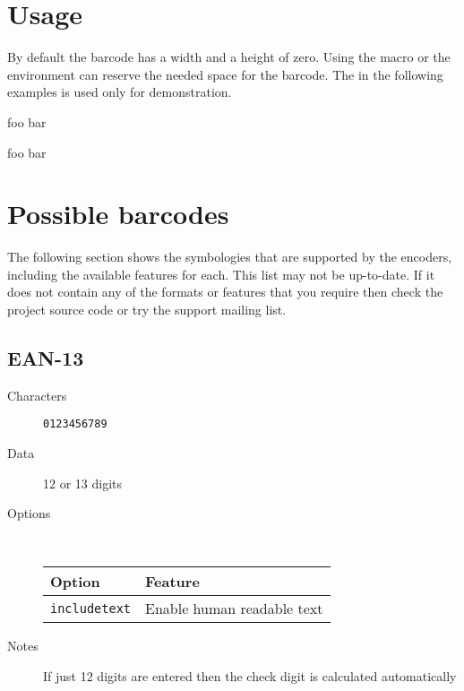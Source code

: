 \documentclass[11pt,english,BCOR10mm,DIV12,bibliography=totoc,parskip=false,smallheadings
    headexclude,footexclude,oneside]{pst-doc}
\begin{document}
\section{Usage}
By default the barcode has a width and a height of zero. Using the 
macro or the  environment can reserve the needed space for
the barcode. The  in the following examples is used
only for demonstration.

\begin{LTXexample}[width=.5\linewidth]
foo
bar
\end{LTXexample}

\bigskip
\begin{LTXexample}[width=.5\linewidth]
foo
bar
\end{LTXexample}


\section{Possible barcodes}

The following section shows the symbologies that are supported by
the encoders, including the available features for each. This list
may not be up-to-date. If it does not contain any of the formats or
features that you require then check the project source code or
try the support mailing list.

\subsection{EAN-13}

\begin{description}
\item[Characters] \verb+0123456789+
\item[Data]  12 or 13 digits
\item[Options]~\\
  \begin{tabular}{l|l}
  Option                   & Feature\\\hline
  \texttt{includetext}     & Enable human readable text\\
  \end{tabular}
\item[Notes] If just 12 digits are entered then the check digit is calculated automatically  
\end{description}
\end{document}
